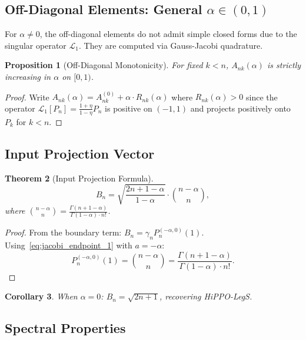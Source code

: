\documentclass{article}
\theoremstyle{plain}
\newtheorem{theorem}{Theorem}[section]
\newtheorem{proposition}[theorem]{Proposition}
\newtheorem{corollary}[theorem]{Corollary}
\theoremstyle{definition}
\theoremstyle{remark}
\begin{document}
\subsection{Off-Diagonal Elements: General $\alpha \in (0,1)$}

For $\alpha \neq 0$, the off-diagonal elements do not admit simple closed forms due to the singular operator $\mathcal{L}_1$. They are computed via Gauss-Jacobi quadrature.

\begin{proposition}[Off-Diagonal Monotonicity]
	For fixed $k < n$, $A_{nk}(\alpha)$ is strictly increasing in $\alpha$ on $[0, 1)$.
\end{proposition}

\begin{proof}
	Write $A_{nk}(\alpha) = A_{nk}^{(0)} + \alpha \cdot R_{nk}(\alpha)$ where $R_{nk}(\alpha) > 0$ since the operator $\mathcal{L}_1[P_n] = \frac{1+\eta}{1-\eta}P_n$ is positive on $(-1,1)$ and projects positively onto $P_k$ for $k < n$.
\end{proof}

\subsection{Input Projection Vector}

\begin{theorem}[Input Projection Formula]
	\begin{equation}
		B_n = \sqrt{\frac{2n+1-\alpha}{1-\alpha}} \cdot \binom{n-\alpha}{n},
	\end{equation}
	where $\binom{n-\alpha}{n} = \frac{\Gamma(n+1-\alpha)}{\Gamma(1-\alpha) \cdot n!}$.
\end{theorem}

\begin{proof}
	From the boundary term: $B_n = \gamma_n P_n^{(-\alpha, 0)}(1)$. Using~\eqref{eq:jacobi_endpoint_1} with $a = -\alpha$:
	\begin{equation}
		P_n^{(-\alpha, 0)}(1) = \binom{n - \alpha}{n} = \frac{\Gamma(n+1-\alpha)}{\Gamma(1-\alpha) \cdot n!}.
	\end{equation}
\end{proof}

\begin{corollary}
	When $\alpha = 0$: $B_n = \sqrt{2n+1}$, recovering HiPPO-LegS.
\end{corollary}

\subsection{Spectral Properties}
\end{document}
